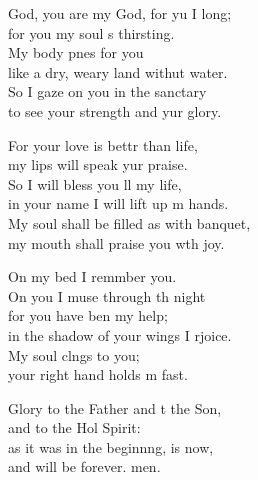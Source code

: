 \begin{psalmverse}
  \begin{patverse}
     God, you are my God, for yu I long;\Med\\
for you my soul \pointup{\i}s thirsting.\\
My body p\pointup{\i}nes for you\Med\\
like a dry, weary land withut water.\\
So I gaze on you in the sanctary\Med\\
to see your strength and yur glory.

For your love is bettr than life,\Med\\
my lips will speak yur praise.\\
So I will bless you ll my life,\Med\\
in your name I will lift up m hands.\\
My soul shall be filled as with  banquet,\Med\\
my mouth shall praise you w\pointup{\i}th joy.

On my bed I remmber you.\Med\\
On you I muse through th night\\
for you have ben my help;\Med\\
in the shadow of your wings I rjoice.\\
My soul cl\pointup{\i}ngs to you;\Med\\
your right hand holds m fast.

Glory to the Father and t the Son,\Med\\
and to the Hol Spirit:\\
as it was in the beginn\pointup{\i}ng, is now,\Med\\
and will be forever. men.
  \end{patverse}
\end{psalmverse}
